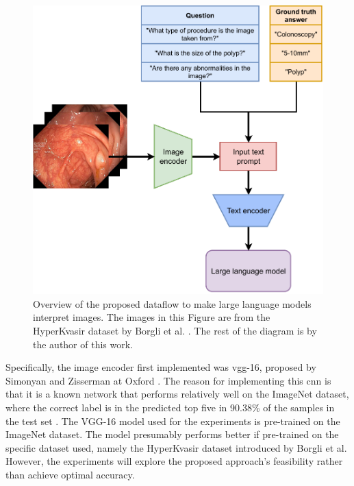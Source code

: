         \begin{figure}[htb]
            \centerline{
            \includegraphics[width=\textwidth]{images/alpaca_vision}}
            \caption[Overview of the proposed dataflow to make large language models interpret images.]{Overview of the proposed dataflow to make large language models interpret images. The images in this Figure are from the HyperKvasir dataset by Borgli et al. \cite{borgliHyperKvasirComprehensiveMulticlass2020}. The rest of the diagram is by the author of this work.}
            \label{fig:alpaca_vision}
        \end{figure}


        Specifically, the image encoder first implemented was \gls{vgg}-16, proposed by Simonyan and Zisserman at Oxford \cite{simonyanVeryDeepConvolutional2015}. The reason for implementing this \gls{cnn} is that it is a known network that performs relatively well on the ImageNet dataset, where the correct label is in the predicted top five in 90.38\% of the samples in the test set \cite{Vgg16TorchvisionMain}. The VGG-16 model used for the experiments is pre-trained on the ImageNet \cite{dengImageNetLargeScaleHierarchical2009} dataset. The model presumably performs better if pre-trained on the specific dataset used, namely the HyperKvasir dataset \cite{borgliHyperKvasirComprehensiveMulticlass2020} introduced by Borgli et al. However, the experiments will explore the proposed approach's feasibility rather than achieve optimal accuracy.

